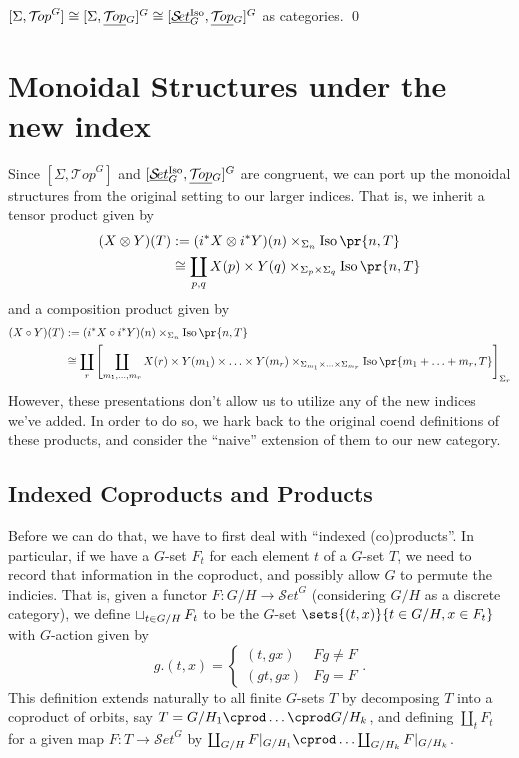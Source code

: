 \documentclass{report}
\newcommand{\Top}{\text{$\mathcal{T}\!op$}}
\newcommand{\Set}{\text{$\mathcal{S}\!et$}}
\DeclareMathOperator{\Iso}{Iso}
\newcommand{\iso}[1]{\text{$\Iso\pr{#1}$}}
\newcommand{\TopG}{\text{\underline{$\Top$}$_G$}}
\newcommand{\SetG}{\text{\underline{$\Set$}$_G^{\mbox{\scriptsize Iso}}$}}
\renewcommand{\ST}{\text{$[\SetG,\TopG]^G$}}
\newcommand{\ico}{\operatornamewithlimits{\sqcup}}
\begin{document}
\begin{cor}
  $[\Sigma,\Top^G]\cong[\Sigma,\TopG]^G\cong\ST$ as categories. \qed
\end{cor}


\section{Monoidal Structures under the new index}
Since $[\Sigma,\Top^G]$ and $\ST$ are congruent, we can port up the monoidal structures from the original setting to our larger indices. That is, we inherit a tensor product given by
\begin{align*}
  (X\otimes Y)(T) &:= (i^*X\otimes i^*Y)(n)\times_{\Sigma_n}\iso{n,T}\\
  &\cong \coprod_{p,q}X(p)\times Y(q)\times_{\Sigma_p\times \Sigma_q}\iso{n,T}
\end{align*}
and a composition product given by
\begin{align*}
  (X\circ Y)(T) &:= (i^*X\circ i^*Y)(n)\times_{\Sigma_n}\iso{n,T}\\
  &\cong \coprod_r\left[\coprod_{m_1,\ldots,m_r}X(r)\times Y(m_1)\times\ldots\times Y(m_r)\times_{\Sigma_{m_1}\times\ldots\times\Sigma_{m_r}}\iso{m_1+\ldots+m_r,T}\right]_{\Sigma_r}
\end{align*}
However, these presentations don't allow us to utilize any of the new indices we've added. In order to do so, we hark back to the original coend definitions of these products, and consider the ``naive'' extension of them to our new category. 


\subsection{Indexed Coproducts and Products}
Before we can do that, we have to first deal with ``indexed (co)products''. In particular, if we have a $G$-set $F_t$ for each element $t$ of a $G$-set $T$, we need to record that information in the coproduct, and possibly allow $G$ to permute the indicies. That is, given a functor $F: G/H\to \Set^G$ (considering $G/H$ as a discrete category), we define $\ico_{t\in G/H}F_t$ to be the $G$-set $\sets{(t,x)}{t\in G/H, x\in F_t}$ with $G$-action given by 
\[g.(t,x) = \left\{\begin{array}{lr}(t,gx) & Fg\neq F\\ (gt,gx) & Fg = F\end{array}\right. .\]
This definition extends naturally to all finite $G$-sets $T$ by decomposing $T$ into a coproduct of orbits, say $T = G/H_1\cprod\ldots\cprod G/H_k$, and defining $\coprod_tF_t$ for a given map $F: T\to \Set^G$ by $\coprod_{G/H}F|_{G/H_1}\cprod \ldots \coprod_{G/H_k}F|_{G/H_k}$.
\end{document}
